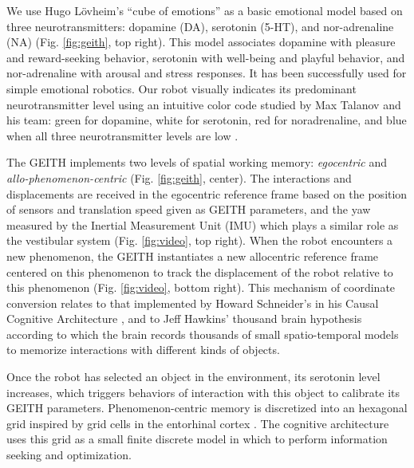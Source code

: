 \documentclass[runningheads]{llncs}
\begin{document}
We use Hugo Lövheim's ``cube of emotions'' \cite{lovheim_new_2012} as a basic emotional model based on three neurotransmitters: dopamine (DA), serotonin (5-HT), and nor-adrenaline (NA) (Fig. \ref{fig:geith}, top right).
This model associates dopamine with pleasure and reward-seeking behavior, serotonin with well-being and playful behavior, and nor-adrenaline with arousal and stress responses.
It has been successfully used for simple emotional robotics.
Our robot visually indicates its predominant neurotransmitter level using an intuitive color code studied by Max Talanov and his team: green for dopamine, white for serotonin, red for noradrenaline, and blue when all three neurotransmitter levels are low \cite{chebotareva_emotional_2019}.

The GEITH implements two levels of spatial working memory: \textit{egocentric} and \textit{allo-phenomenon-centric} (Fig. \ref{fig:geith}, center).  
The interactions and displacements are received in the egocentric reference frame based on the position of sensors and translation speed given as GEITH parameters, and the yaw measured by the Inertial Measurement Unit (IMU) which plays a similar role as the vestibular system %
(Fig. \ref{fig:video}, top right).
When the robot encounters a new phenomenon, the GEITH instantiates a new allocentric reference frame centered on this phenomenon to track the displacement of the robot relative to this phenomenon (Fig. \ref{fig:video}, bottom right). 
This mechanism of coordinate conversion relates to that implemented by Howard Schneider's in his Causal Cognitive Architecture \cite{schneider_emergence_2024}, and to 
Jeff Hawkins' thousand brain hypothesis \cite{hawkins_framework_2019} according to which the brain records thousands of small spatio-temporal models to memorize interactions with different kinds of objects.

Once the robot has selected an object in the environment, its serotonin level increases, which triggers behaviors of interaction with this object to calibrate its GEITH parameters. 
Phenomenon-centric memory is discretized into an hexagonal grid inspired by grid cells in the entorhinal cortex \cite{moser_place_2008}. 
The cognitive architecture uses this grid as a small finite discrete model in which to perform information seeking and optimization. %
\end{document}
